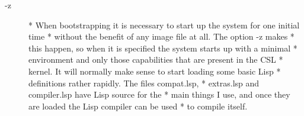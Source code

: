 \documentclass[a4paper,11pt]{article}
\begin{document}
\begin{description}
\item [{\ttfamily -z}] 
          * When bootstrapping it is necessary to start up the system for one initial time
          * without the benefit of any image file at all. The option {\ttfamily -z} makes
          * this happen, so when it is specified the system starts up with a minimal
          * environment and only those capabilities that are present in the CSL
          * kernel. It will normally make sense to start loading some basic Lisp
          * definitions rather rapidly. The files {\ttfamily compat.lsp},
          * {\ttfamily extras.lsp} and {\ttfamily compiler.lsp} have Lisp source for the
          * main things I use, and once they are loaded the Lisp compiler can be used
          * to compile itself.

\end{description} %

\end{document}
